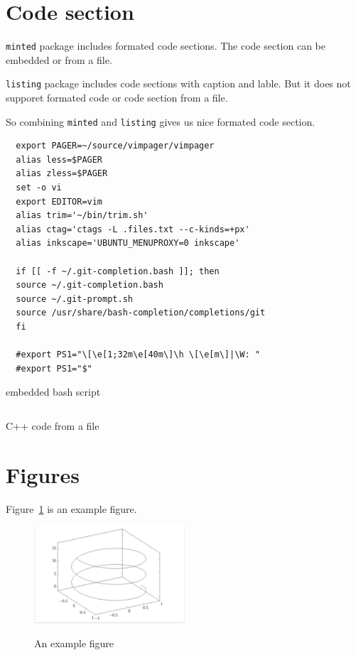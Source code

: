 \section{Code section}
\texttt{minted} package includes formated code sections.
The code section can be embedded or from a file.

\texttt{listing} package includes code sections with caption and lable.
But it does not supporet formated code or code section from a file.

So combining \texttt{minted} and \texttt{listing} gives us nice formated code section.


\begin{listing}[!ht]
\begin{verbatim}
  export PAGER=~/source/vimpager/vimpager
  alias less=$PAGER
  alias zless=$PAGER
  set -o vi
  export EDITOR=vim
  alias trim='~/bin/trim.sh'
  alias ctag='ctags -L .files.txt --c-kinds=+px'
  alias inkscape='UBUNTU_MENUPROXY=0 inkscape'

  if [[ -f ~/.git-completion.bash ]]; then
  source ~/.git-completion.bash
  source ~/.git-prompt.sh
  source /usr/share/bash-completion/completions/git
  fi

  #export PS1="\[\e[1;32m\e[40m\]\h \[\e[m\]|\W: "
  #export PS1="$"
\end{verbatim}
\caption{embedded bash script}
\label{embedded_code_section}
\end{listing}

\begin{listing}[!ht]
  \inputminted[linenos]{cpp}{template/source/helloWorld.cpp}
\caption{C++ code from a file}
\label{file_code_section}
\end{listing}

\section{Figures}%
\label{sub:figures}

Figure~\ref{fig:Example} is an example figure.


\begin{figure}[h]
\caption{An example figure}
\centering
\includegraphics[width=0.5\textwidth]{./template/figure.pdf}
\label{fig:Example}
\end{figure}

